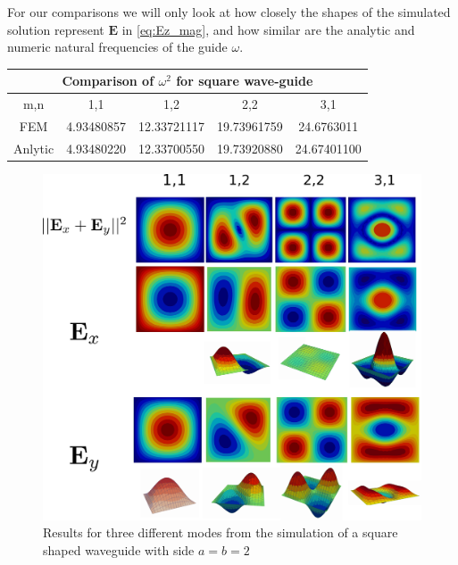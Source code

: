 For our comparisons we will only look at how closely the shapes of the simulated solution represent $\mathbf{E}$ in \ref{eq:Ez_mag}, and how similar are the analytic and numeric  natural frequencies of the guide $\omega$.
\begin{center}
\begin{tabular}{|c|c|c|c|c|}
\hline
\multicolumn{5}{|c|}{Comparison of $\omega^2$ for square wave-guide} \\
\hline 
m,n & 1,1 & 1,2 & 2,2 & 3,1 \\ 
\hline 
FEM & 4.93480857 & 12.33721117 & 19.73961759 & 24.6763011 \\ 
\hline 
Anlytic & 4.93480220 & 12.33700550 & 19.73920880 & 24.67401100 \\ 
\hline 
\end{tabular} 
\label{tab:sq_wav_comparison}
\end{center}

\begin{figure}
\centering
\includegraphics[scale=0.1]{./img/square_waveguide.pdf}
\caption{Results for three different modes from the simulation of a square shaped waveguide with side $a=b=2$}
\label{fig:square_waveguide}
\end{figure}

